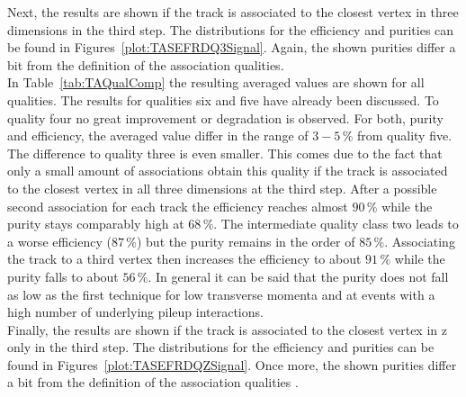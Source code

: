 Next, the results are shown if the track is associated to the closest vertex in three dimensions in the third step. The distributions for the efficiency and purities can be found in Figures~\ref{plot:TASEFRDQ3Signal}. Again, the shown purities differ a bit from the definition of the association qualities. \\
In Table~\ref{tab:TAQualComp} the resulting averaged values are shown for all qualities. The results for qualities six and five have already been discussed. To quality four no great improvement or degradation is observed. For both, purity and efficiency, the averaged value differ in the range of $3-5\,\%$ from quality five. The difference to quality three is even smaller. This comes due to the fact that only a small amount of associations obtain this quality if the track is associated to the closest vertex in all three dimensions at the third step. After a possible second association for each track the efficiency reaches almost $90\,\%$ while the purity stays comparably high at $68\,\%$. The intermediate quality class two leads to a worse efficiency ($87\,\%$) but the purity remains in the order of $85\,\%$. Associating the track to a third vertex then increases the efficiency to about $91\,\%$ while the purity falls to about $56\,\%$. In general it can be said that the purity does not fall as low as the first technique for low transverse momenta and at events with a high number of underlying pileup interactions. \\

Finally, the results are shown if the track is associated to the closest vertex in z only in the third step. The distributions for the efficiency and purities can be found in Figures~\ref{plot:TASEFRDQZSignal}. Once more, the shown purities differ a bit from the definition of the association qualities .

